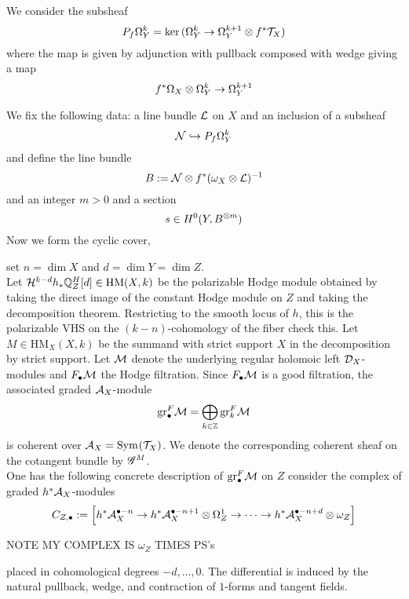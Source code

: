 \documentclass[12pt]{article}
\renewcommand{\gr}{\mathrm{gr}}
\newcommand{\R}{\mathrm{R}}
\begin{document}
\newcommand{\HM}{\mathrm{HM}}
\renewcommand{\R}{\mathbf{R}}

\begin{defn}
We consider the subsheaf
\[ P_f \Omega_{Y}^k = \ker{(\Omega_Y^k \to \Omega_Y^{k+1} \otimes f^* \mathcal{T}_X)} \]
where the map is given by adjunction with pullback composed with wedge giving a map
\[ f^* \Omega_X \otimes \Omega_Y^k \to \Omega_Y^{k+1} \]
\end{defn}

We fix the following data: a line bundle $\mathcal{L}$ on $X$ and an inclusion of a subsheaf
\[ \mathcal{N} \hookrightarrow P_f \Omega_Y^k \]
and define the line bundle
\[ B := \mathcal{N} \otimes f^* (\omega_X \otimes \mathcal{L})^{-1} \]
and an integer $m > 0$ and a section
\[ s \in H^0(Y, B^{\otimes m}) \]
Now we form the cyclic cover,
\begin{center}
\end{center}
set $n = \dim{X}$ and $d = \dim{Y} = \dim{Z}$. 
\bigskip\\
Let $\cH^{k-d} h_* \Q_Z^H[d] \in \HM(X, k)$ be the polarizable Hodge module obtained by taking the direct image of the constant Hodge module on $Z$ and taking the decomposition theorem. Restricting to the smooth locus of $h$, this is the polarizable VHS on the $(k-n)$-cohomology of the fiber {\color{red} check this}. Let $M \in \HM_X(X, k)$ be the summand with strict support $X$ in the decomposition by strict support. Let $\mathcal{M}$ denote the underlying regular holomoic left $\mathcal{D}_X$-modules and $F_\bullet \mathcal{M}$ the Hodge filtration. Since $F_\bullet \mathcal{M}$ is a good filtration, the associated graded $\mathcal{A}_X$-module 
\[ \gr_\bullet^F \M = \bigoplus_{k \in \Z} \gr^F_k \M \]
is coherent over $\mathcal{A}_X = \mathrm{Sym}_{}\! \left( \mathcal{T}_X \right)$. We denote the corresponding coherent sheaf on the cotangent bundle by $\mathscr{G}^M$. 
\bigskip\\
One has the following concrete description of $\gr^F_\bullet \M$ on $Z$ consider the complex of graded $h^* \mathcal{A}_X$-modules
\[ C_{Z, \bullet} := \Big[ h^* \mathcal{A}_X^{\bullet - n} \to h^* \mathcal{A}_X^{\bullet - n + 1} \otimes \Omega_Z^1 \to \cdots \to h^* \mathcal{A}_X^{\bullet - n + d} \otimes \omega_Z \Big] \]

{\color{red} NOTE MY COMPLEX IS $\omega_Z$ TIMES PS's}

placed in cohomological degrees $-d, \dots, 0$. The differential is induced by the natural pullback, wedge, and contraction of $1$-forms and tangent fields. 
\end{document}
